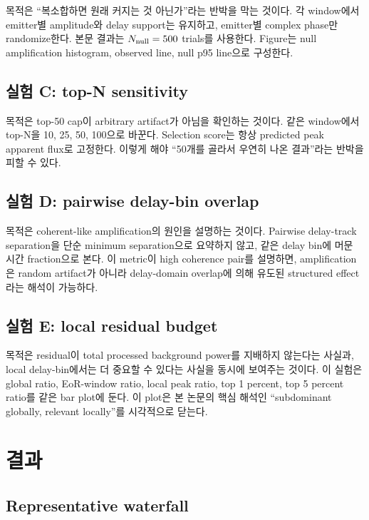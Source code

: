 \documentclass[11pt,a4paper]{article}
\begin{document}
목적은 ``복소합하면 원래 커지는 것 아닌가''라는 반박을 막는 것이다.
각 window에서 emitter별 amplitude와 delay support는 유지하고, emitter별 complex phase만 randomize한다.
본문 결과는 $N_{\rm null}=500$ trials를 사용한다.
Figure는 null amplification histogram, observed line, null p95 line으로 구성한다.

\subsection{실험 C: top-N sensitivity}

목적은 top-50 cap이 arbitrary artifact가 아님을 확인하는 것이다.
같은 window에서 top-N을 10, 25, 50, 100으로 바꾼다.
Selection score는 항상 predicted peak apparent flux로 고정한다.
이렇게 해야 ``50개를 골라서 우연히 나온 결과''라는 반박을 피할 수 있다.

\subsection{실험 D: pairwise delay-bin overlap}

목적은 coherent-like amplification의 원인을 설명하는 것이다.
Pairwise delay-track separation을 단순 minimum separation으로 요약하지 않고, 같은 delay bin에 머문 시간 fraction으로 본다.
이 metric이 high coherence pair를 설명하면, amplification은 random artifact가 아니라 delay-domain overlap에 의해 유도된 structured effect라는 해석이 가능하다.

\subsection{실험 E: local residual budget}

목적은 residual이 total processed background power를 지배하지 않는다는 사실과, local delay-bin에서는 더 중요할 수 있다는 사실을 동시에 보여주는 것이다.
이 실험은 global ratio, EoR-window ratio, local peak ratio, top 1 percent, top 5 percent ratio를 같은 bar plot에 둔다.
이 plot은 본 논문의 핵심 해석인 ``subdominant globally, relevant locally''를 시각적으로 닫는다.

\section{결과}

\subsection{Representative waterfall}
\end{document}
